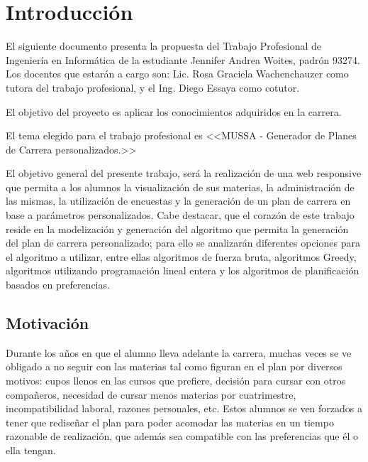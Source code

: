 \documentclass[a4paper]{article}
\begin{document}
  \newpage
  

  \tableofcontents %
    
  \pagestyle{fancy}
  \rhead{}
  \renewcommand{\headrulewidth}{0.4pt} %

  \newpage


\section{Introducción}

El siguiente documento presenta la propuesta del Trabajo Profesional de Ingeniería en Informática de la estudiante Jennifer Andrea Woites, padrón 93274. Los docentes que estarán a cargo son: Lic. Rosa Graciela Wachenchauzer como tutora del trabajo profesional, y el Ing. Diego Essaya como cotutor. \newline

El objetivo del proyecto es aplicar los conocimientos adquiridos en la carrera. \newline

El tema elegido para el trabajo profesional es <<MUSSA - Generador de Planes de Carrera personalizados.>> \newline

El objetivo general del presente trabajo, será la realización de una web responsive que permita a los alumnos la visualización de sus materias, la administración de las mismas, la utilización de encuestas y la generación de un plan de carrera en base a parámetros personalizados. Cabe destacar, que el corazón de este trabajo reside en la modelización y generación del algoritmo que permita la generación del plan de carrera personalizado; para ello se analizarán diferentes opciones para el algoritmo a utilizar, entre ellas algoritmos de fuerza bruta, algoritmos Greedy, algoritmos utilizando programación lineal entera y los algoritmos de planificación basados en preferencias.

\subsection{Motivación}

Durante los años en que el alumno lleva adelante la carrera, muchas veces se ve obligado a no seguir con las materias tal como figuran en el plan por diversos motivos: cupos llenos en las cursos que prefiere, decisión para cursar con otros compañeros, necesidad de cursar menos materias por cuatrimestre, incompatibilidad laboral, razones personales, etc. Estos alumnos se ven forzados a tener que rediseñar el plan para poder acomodar las materias en un tiempo razonable de realización, que además sea compatible con las preferencias que él o ella tengan.
\end{document}
